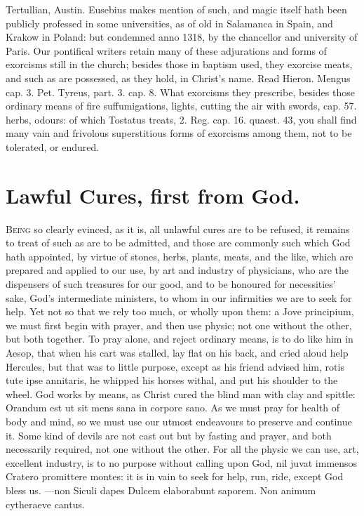 {Tertullian, Austin. Eusebius makes mention of such, and magic itself
hath been publicly professed in some universities, as of old in
Salamanca in Spain, and Krakow in Poland: but condemned anno 1318, by
the chancellor and university of Paris. Our pontifical writers
retain many of these adjurations and forms of exorcisms still in the
church; besides those in baptism used, they exorcise meats, and such as
are possessed, as they hold, in Christ's name. Read Hieron. Mengus cap.
3. Pet. Tyreus, part. 3. cap. 8. What exorcisms they prescribe, besides
those ordinary means of fire suffumigations, lights, cutting the
air with swords, cap. 57. herbs, odours: of which Tostatus treats, 2.
Reg. cap. 16. quaest. 43, you shall find many vain and frivolous
superstitious forms of exorcisms among them, not to be tolerated, or
endured.


\section{Lawful Cures, first from God.}

\lettrine{B}{eing} so clearly evinced, as it is, all unlawful cures are to be
refused, it remains to treat of such as are to be admitted, and those
are commonly such which God hath appointed, by virtue of stones,
herbs, plants, meats, and the like, which are prepared and applied to
our use, by art and industry of physicians, who are the dispensers of
such treasures for our good, and to be honoured for necessities'
sake, God's intermediate ministers, to whom in our infirmities we are
to seek for help. Yet not so that we rely too much, or wholly upon
them: a Jove principium, we must first begin with prayer, and
then use physic; not one without the other, but both together. To pray
alone, and reject ordinary means, is to do like him in Aesop, that when
his cart was stalled, lay flat on his back, and cried aloud help
Hercules, but that was to little purpose, except as his friend advised
him, rotis tute ipse annitaris, he whipped his horses withal, and put
his shoulder to the wheel. God works by means, as Christ cured the
blind man with clay and spittle: Orandum est ut sit mens sana in
corpore sano. As we must pray for health of body and mind, so we must
use our utmost endeavours to preserve and continue it. Some kind of
devils are not cast out but by fasting and prayer, and both necessarily
required, not one without the other. For all the physic we can use,
art, excellent industry, is to no purpose without calling upon God, nil
juvat immensos Cratero promittere montes: it is in vain to seek for
help, run, ride, except God bless us.
---non Siculi dapes
Dulcem elaborabunt saporem.
Non animum cytheraeve cantus.

}
